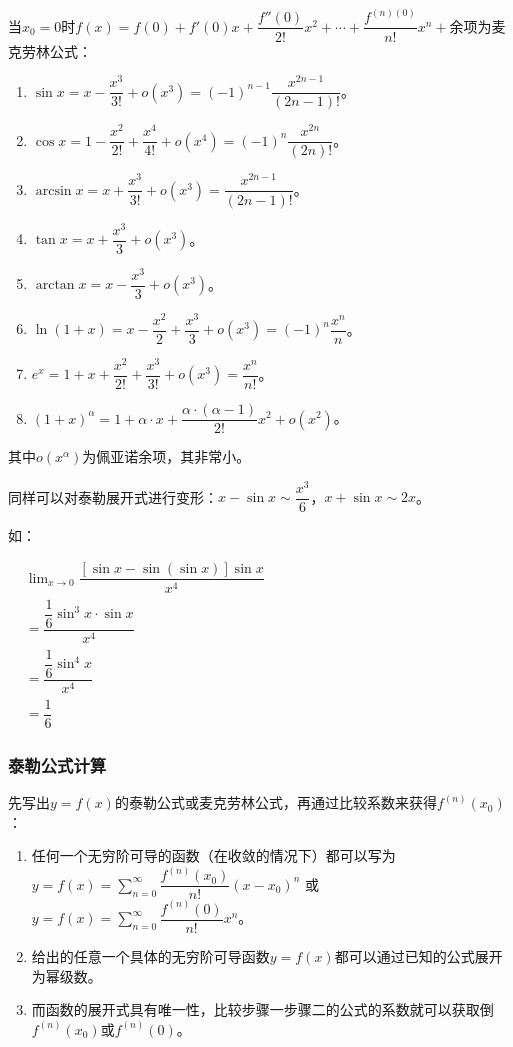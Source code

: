 \documentclass[UTF8, 12pt]{ctexart}
\begin{document}
当$x_0=0$时$f(x)=f(0)+f'(0)x+\dfrac{f''(0)}{2!}x^2+\cdots+\dfrac{f^{(n)(0)}}{n!}x^n+\text{余项}$为麦克劳林公式：

\begin{enumerate}
    \item $\sin x=x-\dfrac{x^3}{3!}+o(x^3)=(-1)^{n-1}\dfrac{x^{2n-1}}{(2n-1)!}$。
    \item $\cos x=1-\dfrac{x^2}{2!}+\dfrac{x^4}{4!}+o(x^4)=(-1)^n\dfrac{x^{2n}}{(2n)!}$。
    \item $\arcsin x=x+\dfrac{x^3}{3!}+o(x^3)=\dfrac{x^{2n-1}}{(2n-1)!}$。
    \item $\tan x=x+\dfrac{x^3}{3}+o(x^3)$。
    \item $\arctan x=x-\dfrac{x^3}{3}+o(x^3)$。
    \item $\ln(1+x)=x-\dfrac{x^2}{2}+\dfrac{x^3}{3}+o(x^3)=(-1)^n\dfrac{x^n}{n}$。
    \item $e^x=1+x+\dfrac{x^2}{2!}+\dfrac{x^3}{3!}+o(x^3)=\dfrac{x^n}{n!}$。
    \item $(1+x)^\alpha=1+\alpha\cdot x+\dfrac{\alpha\cdot(\alpha-1)}{2!}x^2+o(x^2)$。
\end{enumerate}

其中$o(x^\alpha)$为佩亚诺余项，其非常小。

同样可以对泰勒展开式进行变形：$x-\sin x\sim\dfrac{x^3}{6}$，$x+\sin x\sim 2x$。

如：

$
\begin{aligned}
    & \lim_{x\to 0}\dfrac{[\sin x-\sin(\sin x)]\sin x}{x^4} \\
    & =\dfrac{\dfrac{1}{6}\sin^3x\cdot\sin x}{x^4} \\
    & =\dfrac{\dfrac{1}{6}\sin^4x}{x^4} \\
    & =\dfrac{1}{6}
\end{aligned}
$

\subsubsection{泰勒公式计算}

先写出$y=f(x)$的泰勒公式或麦克劳林公式，再通过比较系数来获得$f^{(n)}(x_0)$：

\begin{enumerate}
    \item 任何一个无穷阶可导的函数（在收敛的情况下）都可以写为 \\
    $y=f(x)=\sum_{n=0}^\infty\dfrac{f^{(n)}(x_0)}{n!}(x-x_0)^n$ 或 $y=f(x)=\sum_{n=0}^\infty\dfrac{f^{(n)}(0)}{n!}x^n$。
    \item 给出的任意一个具体的无穷阶可导函数$y=f(x)$都可以通过已知的公式展开为幂级数。
    \item 而函数的展开式具有唯一性，比较步骤一步骤二的公式的系数就可以获取倒$f^{(n)}(x_0)$或$f^{(n)}(0)$。
\end{enumerate}
\end{document}
